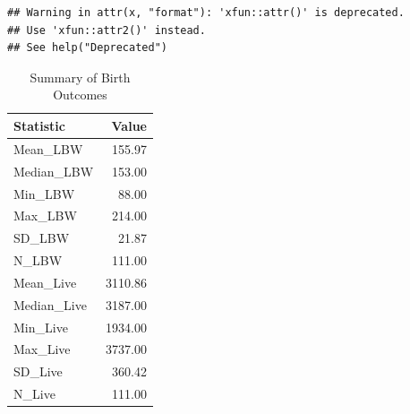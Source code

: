 \documentclass[
]{article}
\begin{document}
\begin{verbatim}
## Warning in attr(x, "format"): 'xfun::attr()' is deprecated.
## Use 'xfun::attr2()' instead.
## See help("Deprecated")
\end{verbatim}

\begin{longtable}[t]{lr}
\caption{\label{tab:Sumamry Staistics}Summary of Birth Outcomes}\\
\toprule
Statistic & Value\\
\midrule
Mean\_LBW & 155.97\\
Median\_LBW & 153.00\\
Min\_LBW & 88.00\\
Max\_LBW & 214.00\\
SD\_LBW & 21.87\\
\addlinespace
N\_LBW & 111.00\\
Mean\_Live & 3110.86\\
Median\_Live & 3187.00\\
Min\_Live & 1934.00\\
Max\_Live & 3737.00\\
\addlinespace
SD\_Live & 360.42\\
N\_Live & 111.00\\
\bottomrule
\end{longtable}
\end{document}

